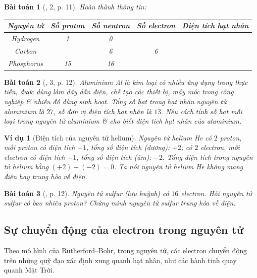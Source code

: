 \documentclass{article}
\newtheorem{baitoan}{Bài toán}
\newtheorem{vidu}{Ví dụ}
\begin{document}
\begin{baitoan}[\cite{SGK_KHTN_7_Canh_Dieu}, 2, p. 11]
	Hoàn thành thông tin:
	\begin{table}[H]
		\centering
		\begin{tabular}{|c|c|c|c|c|}
			\hline
			Nguyên tử & Số proton & Số neutron & Số electron & Điện tích hạt nhân \\
			\hline
			Hydrogen & 1 & 0 &  &  \\
			\hline
			Carbon &  & 6 & 6 &  \\
			\hline
			Phosphorus & 15 & 16 &  &  \\
			\hline
		\end{tabular}
	\end{table}
\end{baitoan}

\begin{baitoan}[\cite{SGK_KHTN_7_Canh_Dieu}, 3, p. 12]
	Aluminium \emph{Al} là kim loại có nhiều ứng dụng trong thực tiễn, được dùng làm dây dẫn điện, chế tạo các thiết bị, máy móc trong công nghiệp \& nhiều đồ dùng sinh hoạt. Tổng số hạt trong hạt nhân nguyên tử aluminium là $27$, số đơn vị điện tích hạt nhân là $13$. Nêu cách tính số hạt mỗi loại trong nguyên tử aluminium \& cho biết điện tích hạt nhân của aluminium.
\end{baitoan}

\begin{vidu}[Điện tích của nguyên tử helium]
	Nguyên tử helium \emph{He} có $2$ proton, mỗi proton có điện tích $+1$, tổng số điện tích (dương): $+2$; có $2$ electron, mỗi electron có điện tích $-1$, tổng số điện tích (âm): $-2$. Tổng điện tích trong nguyên tử helium bằng $(+2) + (-2) = 0$. Ta nói nguyên tử helium \emph{He} \emph{không mang điện} hay \emph{trung hòa về điện}.
\end{vidu}

\begin{baitoan}[\cite{SGK_KHTN_7_Canh_Dieu}, p. 12]
	Nguyên tử sulfur (lưu huỳnh) có $16$ electron. Hỏi nguyên tử sulfur có bao nhiêu proton? Chứng minh nguyên tử sulfur trung hòa về điện.
\end{baitoan}

\subsection{Sự chuyển động của electron trong nguyên tử}
Theo mô hình của Rutherford--Bohr, trong nguyên tử, các electron chuyển động trên những quỹ đạo xác định xung quanh hạt nhân, như các hành tinh quay quanh Mặt Trời.
\end{document}
